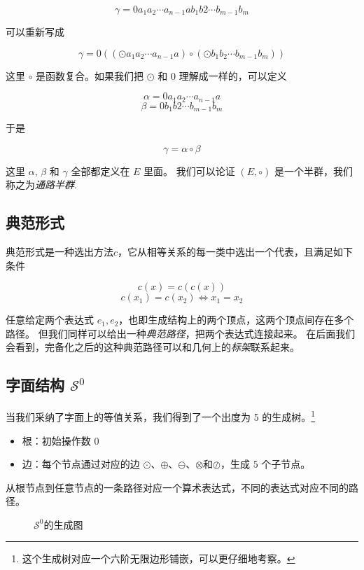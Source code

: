 \documentclass[a4paper,12pt]{article}
\numberwithin{definition}{section}
\numberwithin{lemma}{section}
\numberwithin{proposition}{section}
\numberwithin{theorem}{section}
\numberwithin{grammar}{section}
\numberwithin{program}{section}
\numberwithin{convention}{section}
\numberwithin{corollary}{section}
\begin{document}
$$\gamma = 0 a_1 a_2 \cdots a_{n-1} a b_1 b2 \cdots b_{m-1} b_m$$

可以重新写成

$$\gamma = 0 ((\odot a_1 a_2 \cdots a_{n-1} a) \circ (\odot b_1 b_2 \cdots b_{m-1} b_m))$$

这里 $\circ$ 是函数复合。如果我们把 $\odot$ 和 $0$ 理解成一样的，可以定义

$$\alpha = 0 a_1 a_2 \cdots a_{n-1} a$$
$$\beta = 0 b_1 b2 \cdots b_{m-1} b_m$$

于是

$$\gamma = \alpha \circ \beta$$

这里 $\alpha$, $\beta$ 和 $\gamma$ 全部都定义在 $E$ 里面。 我们可以论证 $(E, \circ)$ 是一个半群，我们称之为\emph{通路半群}.

\subsection{典范形式}\label{subsec:canonical}

典范形式是一种选出方法$c$，它从相等关系的每一类中选出一个代表，且满足如下条件

$$  c(x) = c(c(x)) $$
$$  c(x_1) = c(x_2) \iff x_1 = x_2  $$

任意给定两个表达式 $e_1, e_2$，也即生成结构上的两个顶点，这两个顶点间存在多个路径。
但我们同样可以给出一种\emph{典范路径}，把两个表达式连接起来。
在后面我们会看到，完备化之后的这种典范路径可以和几何上的\emph{标架}联系起来。

\subsection{字面结构 $\mathcal{S}^0$}\label{subsec:literial}

当我们采纳了字面上的等值关系，我们得到了一个出度为 5 的生成树。\footnote[2]{这个生成树对应一个六阶无限边形铺嵌，可以更仔细地考察。}

\begin{itemize}
    \item 根：初始操作数 $0$
    \item 边：每个节点通过对应的边 $\odot$、$\oplus$、$\ominus$、$\otimes$和$\oslash$，生成 $5$ 个子节点。
\end{itemize}

从根节点到任意节点的一条路径对应一个算术表达式，不同的表达式对应不同的路径。

\begin{figure}[ht]
\centering
{}
\caption{$\mathcal{S}^0$的生成图}
\end{figure}
\end{document}
